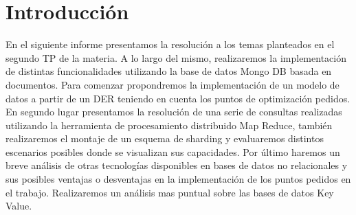 \section{Introducci\'on}

En el siguiente informe presentamos la resoluci\'on a los temas planteados en el segundo TP de la materia. A lo largo del mismo, realizaremos la implementaci\'on de distintas funcionalidades utilizando la base de datos Mongo DB basada en documentos. Para comenzar propondremos la implementaci\'on de un modelo de datos a partir de un DER teniendo en cuenta los puntos de optimizaci\'on pedidos. En segundo lugar presentamos la resoluci\'on de una serie de consultas realizadas utilizando la herramienta de procesamiento distribuido Map Reduce, tambi\'en realizaremos el montaje de un esquema de sharding y evaluaremos distintos escenarios posibles donde se visualizan sus capacidades. Por \'ultimo haremos un breve an\'alisis de otras tecnolog\'ias disponibles en bases de datos no relacionales y sus posibles ventajas o desventajas en la implementaci\'on de los puntos pedidos en el trabajo. Realizaremos un an\'alisis mas puntual sobre las bases de datos Key Value.

